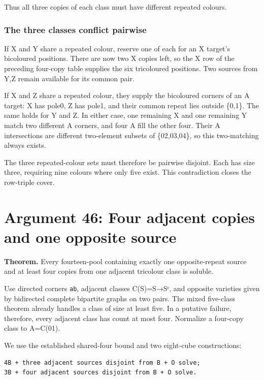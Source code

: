\documentclass[
  10pt,
]{article}
\begin{document}
Thus all three copies of each class must have different repeated
colours.

\hypertarget{the-three-classes-conflict-pairwise}{%
\subsubsection*{The three classes conflict
pairwise}\label{the-three-classes-conflict-pairwise}}

If X and Y share a repeated colour, reserve one of each for an X
target's bicoloured positions. There are now two X copies left, so the X
row of the preceding four-copy table supplies the six tricoloured
positions. Two sources from Y,Z remain available for its common pair.

If X and Z share a repeated colour, they supply the bicoloured corners
of an A target: X has pole0, Z has pole1, and their common repeat lies
outside \{0,1\}. The same holds for Y and Z. In either case, one
remaining X and one remaining Y match two different A corners, and four
A fill the other four. Their A intersections are different two-element
subsets of \{02,03,04\}, so this two-matching always exists.

The three repeated-colour sets must therefore be pairwise disjoint. Each
has size three, requiring nine colours where only five exist. This
contradiction closes the row-triple cover.

\hypertarget{arg-46}{%
\section{Argument 46: Four adjacent copies and one opposite
source}\label{arg-46}}

\textbf{Theorem.} Every fourteen-pool containing exactly one
opposite-repeat source and at least four copies from one adjacent
tricolour class is soluble.

Use directed corners \texttt{ab}, adjacent classes C(S)=S→Sᶜ, and
opposite varieties given by bidirected complete bipartite graphs on two
pairs. The mixed five-class theorem already handles a class of size at
least five. In a putative failure, therefore, every adjacent class has
count at most four. Normalize a four-copy class to A=C(01).

We use the established shared-four bound and two eight-cube
constructions:

\begin{verbatim}
4B + three adjacent sources disjoint from B + O solve;
3B + four adjacent sources disjoint from B + O solve.
\end{verbatim}
\end{document}
